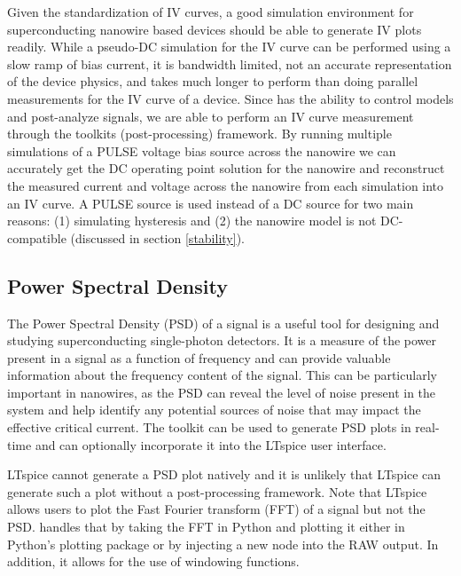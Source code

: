 Given the standardization of IV curves, a good simulation environment for superconducting nanowire based devices
should be able to generate IV plots readily. While a pseudo-DC simulation for the IV curve can be performed
using a slow ramp of bias current, it is bandwidth limited, not an accurate representation of the device physics, 
and takes much longer to perform than doing parallel measurements for the IV curve of a device. Since 
has the ability to control models and post-analyze signals, we are able to perform an IV curve measurement through
the  toolkits (post-processing) framework. By running multiple simulations of a PULSE voltage bias source across the nanowire
we can accurately get the DC operating point solution for the nanowire and reconstruct the measured current and voltage
across the nanowire from each simulation into an IV curve. A PULSE source is used instead of a DC 
source for two main reasons: (1) 
simulating hysteresis and (2) the nanowire model is not DC-compatible (discussed in section \ref{stability}).


\subsection{Power Spectral Density}

The Power Spectral Density (PSD) of a signal is a useful tool for designing and studying
superconducting single-photon detectors. It is a 
measure of the power present in a signal as a function of frequency and can provide valuable information about 
the frequency content of the signal. This can be particularly important in nanowires, 
as the PSD can reveal the level of noise present in the system and help identify any 
potential sources of noise that may impact the effective critical current. 
The  toolkit can be used to generate PSD plots in real-time and can 
optionally incorporate it into the LTspice user interface.

LTspice cannot generate a PSD plot natively and it is unlikely that LTspice
 can generate such a plot without a post-processing framework.
Note that LTspice allows users to plot the Fast Fourier transform (FFT) of a signal but not the 
PSD.  handles that by taking the FFT in Python and plotting it either in Python's 
plotting package  or by injecting a new node into the RAW output. In addition,
it allows for the use of windowing functions.

